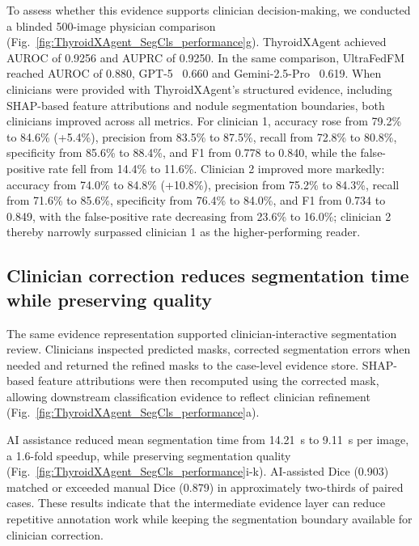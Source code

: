 \documentclass[fleqn,10pt]{wlscirep}
\begin{document}
To assess whether this evidence supports clinician decision-making, we conducted a blinded 500-image physician comparison (Fig.~\ref{fig:ThyroidXAgent_SegCls_performance}g). ThyroidXAgent achieved AUROC of 0.9256 and AUPRC of 0.9250. In the same comparison, UltraFedFM~\cite{jiang2025pretraining} reached AUROC of 0.880, GPT-5~\cite{openai2025gpt5systemcard} 0.660 and Gemini-2.5-Pro~\cite{comanici_gemini_2025} 0.619. When clinicians were provided with ThyroidXAgent's structured evidence, including SHAP-based feature attributions and nodule segmentation boundaries, both clinicians improved across all metrics. For clinician 1, accuracy rose from 79.2\% to 84.6\% (+5.4\%), precision from 83.5\% to 87.5\%, recall from 72.8\% to 80.8\%, specificity from 85.6\% to 88.4\%, and F1 from 0.778 to 0.840, while the false-positive rate fell from 14.4\% to 11.6\%. Clinician 2 improved more markedly: accuracy from 74.0\% to 84.8\% (+10.8\%), precision from 75.2\% to 84.3\%, recall from 71.6\% to 85.6\%, specificity from 76.4\% to 84.0\%, and F1 from 0.734 to 0.849, with the false-positive rate decreasing from 23.6\% to 16.0\%; clinician 2 thereby narrowly surpassed clinician 1 as the higher-performing reader.

\subsection{Clinician correction reduces segmentation time while preserving quality}

The same evidence representation supported clinician-interactive segmentation review. Clinicians inspected predicted masks, corrected segmentation errors when needed and returned the refined masks to the case-level evidence store. SHAP-based feature attributions were then recomputed using the corrected mask, allowing downstream classification evidence to reflect clinician refinement (Fig.~\ref{fig:ThyroidXAgent_SegCls_performance}a).

AI assistance reduced mean segmentation time from 14.21~s to 9.11~s per image, a 1.6-fold speedup, while preserving segmentation quality (Fig.~\ref{fig:ThyroidXAgent_SegCls_performance}i-k). AI-assisted Dice (0.903) matched or exceeded manual Dice (0.879) in approximately two-thirds of paired cases. These results indicate that the intermediate evidence layer can reduce repetitive annotation work while keeping the segmentation boundary available for clinician correction.
\end{document}
